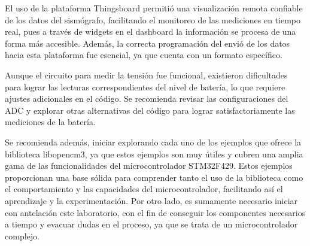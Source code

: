 \documentclass[12pt,a4paper]{article}
\begin{document}
El uso de la plataforma Thingsboard permitió una visualización remota confiable de los datos del sismógrafo, facilitando el monitoreo de las mediciones en tiempo real, pues a través de widgets en el dashboard la información se procesa de una forma más accesible. Además, la correcta programación del envió de los datos hacia esta plataforma fue esencial, ya que cuenta con un formato específico.

Aunque el circuito para medir la tensión fue funcional, existieron dificultades para lograr las lecturas correspondientes del nivel de batería, lo que requiere ajustes adicionales en el código. Se recomienda revisar las configuraciones del ADC y explorar otras alternativas del código para lograr satisfactoriamente las mediciones de la batería.

Se recomienda además, iniciar explorando cada uno de los ejemplos que ofrece la biblioteca libopencm3, ya que estos ejemplos son muy útiles y cubren una amplia gama de las funcionalidades del microcontrolador STM32F429. Estos ejemplos proporcionan una base sólida para comprender tanto el uso de la biblioteca como el comportamiento y las capacidades del microcontrolador, facilitando así el aprendizaje y la experimentación. Por otro lado, es sumamente necesario iniciar con antelación este laboratorio, con el fin de conseguir los componentes necesarios a tiempo y evacuar dudas en el proceso, ya que se trata de un microcontrolador complejo.
\end{document}
